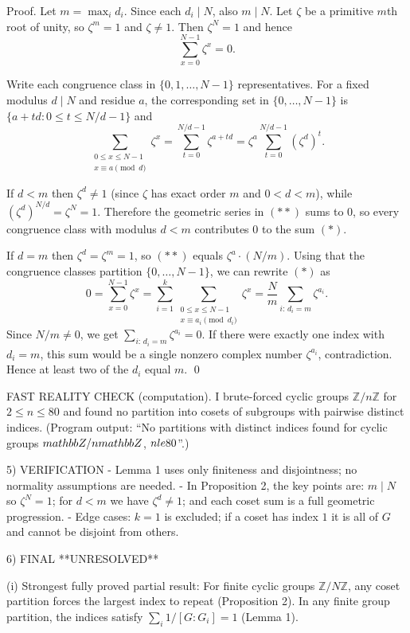 Proof.
Let $m=\max_i d_i$. Since each $d_i\mid N$, also $m\mid N$.
Let $\zeta$ be a primitive $m$th root of unity, so $\zeta^m=1$ and $\zeta\ne 1$. Then $\zeta^N=1$ and hence
\[\sum_{x=0}^{N-1}\zeta^x=0.\tag{$\ast$}\]

Write each congruence class in $\{0,1,\dots,N-1\}$ representatives. For a fixed modulus $d\mid N$ and residue $a$,
the corresponding set in $\{0,\dots,N-1\}$ is $\{a+td:0\le t\le N/d-1\}$ and
\[\sum_{\substack{0\le x\le N-1\\ x\equiv a\!\!\!\!\pmod d}}\zeta^x
=\sum_{t=0}^{N/d-1}\zeta^{a+td}
=\zeta^a\sum_{t=0}^{N/d-1}(\zeta^d)^t.\tag{$\ast\ast$}\]

If $d<m$ then $\zeta^d\ne 1$ (since $\zeta$ has exact order $m$ and $0<d<m$), while $(\zeta^d)^{N/d}=\zeta^N=1$.
Therefore the geometric series in $(\ast\ast)$ sums to $0$, so every congruence class with modulus $d<m$ contributes $0$
to the sum $(\ast)$.

If $d=m$ then $\zeta^d=\zeta^m=1$, so $(\ast\ast)$ equals $\zeta^a\cdot (N/m)$.
Using that the congruence classes partition $\{0,\dots,N-1\}$, we can rewrite $(\ast)$ as
\[0=\sum_{x=0}^{N-1}\zeta^x=\sum_{i=1}^k \sum_{\substack{0\le x\le N-1\\ x\equiv a_i\!\!\!\!\pmod {d_i}}}\zeta^x
=\frac{N}{m}\sum_{i:\, d_i=m}\zeta^{a_i}.\]
Since $N/m\ne 0$, we get $\sum_{i:\, d_i=m}\zeta^{a_i}=0$.
If there were exactly one index with $d_i=m$, this sum would be a single nonzero complex number $\zeta^{a_i}$, contradiction.
Hence at least two of the $d_i$ equal $m$. \qed

FAST REALITY CHECK (computation).
I brute-forced cyclic groups $\mathbb{Z}/n\mathbb{Z}$ for $2\le n\le 80$ and found no partition into cosets of subgroups with pairwise distinct indices.
(Program output: “No partitions with distinct indices found for cyclic groups $\\mathbb{Z}/n\\mathbb{Z}$, $n\\le 80$”.)

5) VERIFICATION
- Lemma 1 uses only finiteness and disjointness; no normality assumptions are needed.
- In Proposition 2, the key points are: $m\mid N$ so $\zeta^N=1$; for $d<m$ we have $\zeta^d\ne 1$; and each coset sum is a full geometric progression.
- Edge cases: $k=1$ is excluded; if a coset has index $1$ it is all of $G$ and cannot be disjoint from others.

6) FINAL
**UNRESOLVED**

(i) Strongest fully proved partial result:
For finite cyclic groups $\mathbb{Z}/N\mathbb{Z}$, any coset partition forces the largest index to repeat (Proposition 2). In any finite group partition, the indices satisfy $\sum_i 1/[G:G_i]=1$ (Lemma 1).


